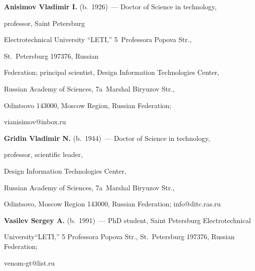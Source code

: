 \noindent


\textbf{Anisimov Vladimir I.} (b.\ 1926)~--- Doctor of Science in technology, 


professor, Saint Petersburg 


Electrotechnical University ``LETI,'' 5~Professora Popova Str., 


St.\ Petersburg 197376, Russian 


Federation; principal scientist, Design Information Technologies Center, 


Russian Academy of Sciences, 7a~Marshal Biryuzov Str., 


Odintsovo 143000, Moscow Region, Russian Federation; 


\mbox{vianisimov@inbox.ru} 





\vspace*{3pt}








\noindent


\textbf{Gridin Vladimir N.} (b.\ 1944)~--- Doctor of Science in technology, 


professor, scientific leader, 


Design Information Technologies Center, 


Russian Academy of Sciences, 7a~Marshal Biryuzov Str., 


Odintsovo, Moscow Region  143000, Russian Federation; info@ditc.ras.ru








\vspace*{3pt}








\noindent


\textbf{Vasilev Sergey A.} (b.\ 1991)~--- PhD student, Saint Petersburg Electrotechnical 


University``LETI,'' 5 Professora Popova Str., St.\ Petersburg 197376, Russian Federation; 


venom-gt@list.ru 





\label{end\stat}








\renewcommand{\bibname}{\protect\rm Литература}


